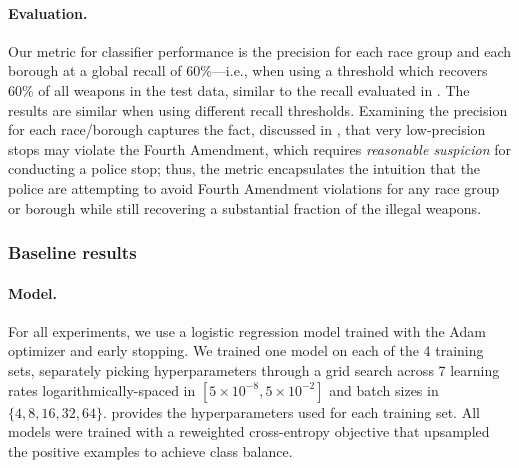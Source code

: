 \paragraph{Evaluation.}
Our metric for classifier performance is the precision for each race group and each borough at a global recall
of 60\%---i.e., when using a threshold which recovers 60\% of all weapons in the test data, similar to the recall evaluated in \citet{goel_precinct_2016}.
The results are similar when using different recall thresholds.
Examining the precision for each race/borough captures the fact, discussed in \citet{goel_precinct_2016}, that very low-precision stops may violate the Fourth Amendment, which requires \emph{reasonable suspicion} for conducting a police stop; thus, the metric encapsulates the intuition that the police are attempting to avoid Fourth Amendment violations for any race group or borough while still recovering a substantial fraction of the illegal weapons.

\subsubsection{Baseline results}

\paragraph{Model.} For all experiments, we use a logistic regression model trained with the Adam optimizer \citep{kingma2014adam} and early stopping.
We trained one model on each of the 4 training sets, separately picking hyperparameters through a grid search across 7 learning rates logarithmically-spaced in $[5 \times 10^{-8}, 5 \times 10^{-2}]$ and batch sizes in $\{4,8,16,32,64\}$.
 provides the hyperparameters used for each training set.
All models were trained with a reweighted cross-entropy objective that upsampled the positive examples to achieve class balance.


